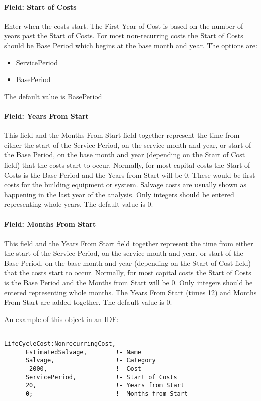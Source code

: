 \paragraph{Field: Start of Costs}\label{field-start-of-costs}

Enter when the costs start. The First Year of Cost is based on the number of years past the Start of Costs. For most non-recurring costs the Start of Costs should be Base Period which begins at the base month and year. The options are:

\begin{itemize}
\item
  ServicePeriod
\item
  BasePeriod
\end{itemize}

The default value is BasePeriod

\paragraph{Field: Years From Start}\label{field-years-from-start}

This field and the Months From Start field together represent the time from either the start of the Service Period, on the service month and year, or start of the Base Period, on the base month and year (depending on the Start of Cost field) that the costs start to occur. Normally, for most capital costs the Start of Costs is the Base Period and the Years from Start will be 0. These would be first costs for the building equipment or system. Salvage costs are usually shown as happening in the last year of the analysis. Only integers should be entered representing whole years. The default value is 0.

\paragraph{Field: Months From Start}\label{field-months-from-start}

This field and the Years From Start field together represent the time from either the start of the Service Period, on the service month and year, or start of the Base Period, on the base month and year (depending on the Start of Cost field) that the costs start to occur. Normally, for most capital costs the Start of Costs is the Base Period and the Months from Start will be 0. Only integers should be entered representing whole months. The Years From Start (times 12) and Months From Start are added together. The default value is 0.

An example of this object in an IDF:

\begin{lstlisting}

LifeCycleCost:NonrecurringCost,
      EstimatedSalvage,        !- Name
      Salvage,                 !- Category
      -2000,                   !- Cost
      ServicePeriod,           !- Start of Costs
      20,                      !- Years from Start
      0;                       !- Months from Start
\end{lstlisting}
